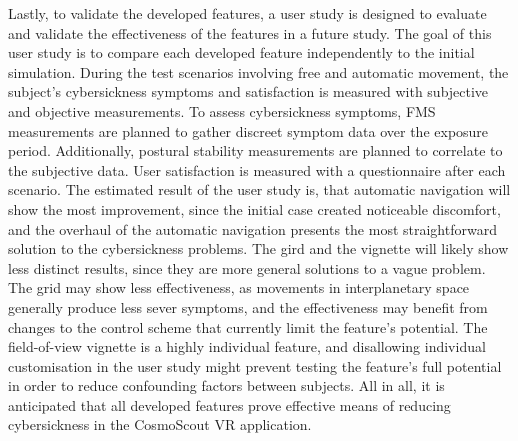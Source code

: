 Lastly, to validate the developed features, a user study is designed to evaluate and validate the effectiveness of
the features in a future study.
The goal of this user study is to compare each developed feature independently to the initial simulation.
During the test scenarios involving free and automatic movement, the subject's cybersickness symptoms and satisfaction
is measured with subjective and objective measurements.
To assess cybersickness symptoms, FMS measurements are planned to gather discreet symptom data over the exposure period.
Additionally, postural stability measurements are planned to correlate to the subjective data.
User satisfaction is measured with a questionnaire after each scenario.
The estimated result of the user study is, that automatic navigation will show the most improvement, since the
initial case created noticeable discomfort, and the overhaul of the automatic navigation presents the most
straightforward solution to the cybersickness problems.
The gird and the vignette will likely show less distinct results, since they are more general solutions to a vague
problem.
The grid may show less effectiveness, as movements in interplanetary space generally produce less sever symptoms, and
the effectiveness may benefit from changes to the control scheme that currently limit the feature's potential.
The field-of-view vignette is a highly individual feature, and disallowing individual customisation in the user study
might prevent testing the feature's full potential in order to reduce confounding factors between subjects.
All in all, it is anticipated that all developed features prove effective means of reducing cybersickness in the
CosmoScout VR application.
